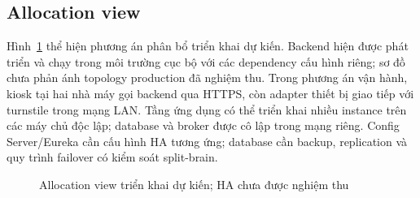 \subsection{Allocation view}
\label{subsec:allocation-view}
Hình~\ref{fig:allocation} thể hiện phương án phân bổ triển khai dự kiến. Backend hiện được phát triển và chạy trong môi trường cục bộ với các dependency cấu hình riêng; sơ đồ chưa phản ánh topology production đã nghiệm thu. Trong phương án vận hành, kiosk tại hai nhà máy gọi backend qua HTTPS, còn adapter thiết bị giao tiếp với turnstile trong mạng LAN. Tầng ứng dụng có thể triển khai nhiều instance trên các máy chủ độc lập; database và broker được cô lập trong mạng riêng. Config Server/Eureka cần cấu hình HA tương ứng; database cần backup, replication và quy trình failover có kiểm soát split-brain.

\begin{figure}[htbp]
\centering
{}%
\caption{Allocation view triển khai dự kiến; HA chưa được nghiệm thu}
\label{fig:allocation}
\end{figure}

